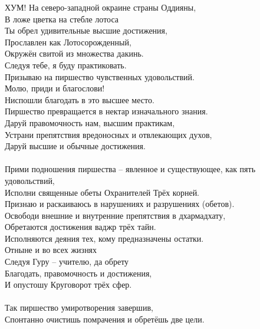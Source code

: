\documentclass[4pt,oneside]{article}
\begin{document}
\newpage
ХУМ! На северо-западной окраине страны Оддияны,\\
В ложе цветка на стебле лотоса\\
Ты обрел удивительные высшие достижения,\\
Прославлен как Лотосорожденный,\\
Окружён свитой из множества дакинь.\\
Следуя тебе, я буду практиковать.\\
Призываю на пиршество чувственных удовольствий.\\
Молю, приди и благослови!\\
Ниспошли благодать в это высшее место.\\
Пиршество превращается в нектар изначального знания.\\
Даруй правомочность нам, высшим практикам,\\
Устрани препятствия вредоносных и отвлекающих духов,\\
Даруй высшие и обычные достижения.\\
\\
Прими подношения пиршества – явленное и существующее, как пять удовольствий,\\
Исполни священные обеты Охранителей Трёх корней.\\
Признаю и раскаиваюсь в нарушениях и разрушениях (обетов).\\
Освободи внешние и внутренние препятствия в дхармадхату,\\
Обретаются достижения ваджр трёх тайн.\\
Исполняются деяния тех, кому предназначены остатки.\\
Отныне и во всех жизнях\\
Следуя Гуру – учителю, да обрету\\
Благодать, правомочность и достижения,\\
И опустошу Круговорот трёх сфер.\\
\\

\scriptsize
Так пиршество умиротворения завершив,\\
Спонтанно очистишь помрачения и обретёшь две цели.
\end{document}
